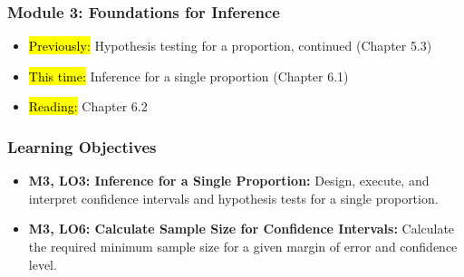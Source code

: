 
\begin{frame}
    \frametitle{Module 3: Foundations for Inference}
    \begin{itemize}
        \item \hl{Previously: }Hypothesis testing for a proportion, continued (Chapter 5.3)
        \item \hl{This time: }Inference for a single proportion (Chapter 6.1)
        \item \hl{Reading: }Chapter 6.2
    \end{itemize}

\end{frame}
\begin{frame}
    \frametitle{Learning Objectives}
    \begin{itemize}
        \item \textbf{M3, LO3: Inference for a Single Proportion:} Design, execute, and interpret confidence intervals and hypothesis tests for a single proportion.
        \item \textbf{M3, LO6: Calculate Sample Size for Confidence Intervals:} Calculate the required minimum sample size for a given margin of error and confidence level.
    \end{itemize}
\end{frame}
